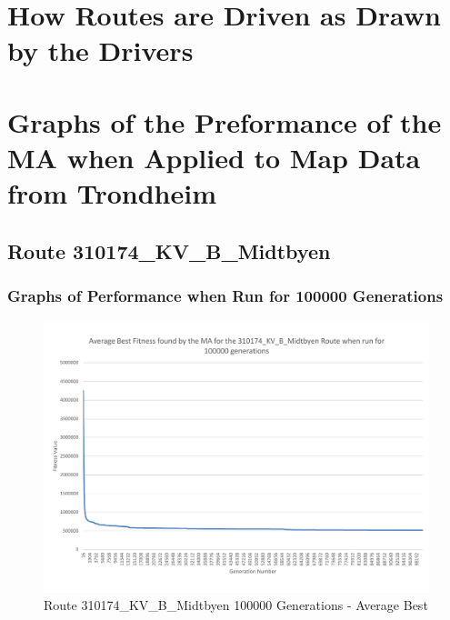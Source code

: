 


\chapter{How Routes are Driven as Drawn by the Drivers} %
\label{cha:how_routes_are_driven_as_drawn_by_the_drivers}







\chapter{Graphs of the Preformance of the MA when Applied to Map Data from Trondheim} %
\label{cha:gotpotmwatmdft}

\section{Route 310174\_KV\_B\_Midtbyen} %
\label{sec:route_310174_KV_B_Midtbyen}

\subsection{Graphs of Performance when Run for 100000 Generations} %
\label{sub:graphs_of_performance_when_run_for_100000_generations_KV_B}

\begin{landscape}
\begin{figure}[thbp]
	\centerline{\includegraphics[height=0.945\textwidth]{figures/Trondheim_graphs/KV_B/KV_B-100k_average_best.pdf}}
	\caption{Route 310174\_KV\_B\_Midtbyen 100000 Generations - Average Best}
	\label{fig:KV_B_100k_ab}
\end{figure}
\end{landscape}

